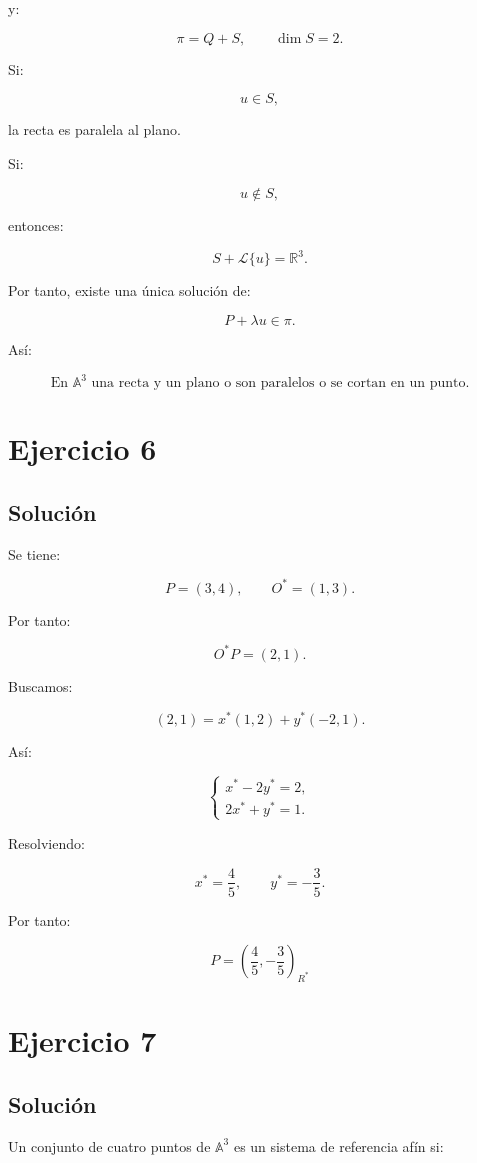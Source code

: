 \documentclass[11pt,a4paper]{article}
\newcommand{\R}{\mathbb{R}}
\begin{document}
y:

\[
\pi=Q+S,
\qquad
\dim S=2.
\]

Si:

\[
u\in S,
\]

la recta es paralela al plano.

Si:

\[
u\notin S,
\]

entonces:

\[
S+\mathcal L\{u\}=\R^3.
\]

Por tanto, existe una única solución de:

\[
P+\lambda u\in\pi.
\]

Así:

\[
\boxed{
\text{En }\mathbb A^3\text{ una recta y un plano o son paralelos o se cortan en un punto.}
}
\]

\section{Ejercicio 6}
\subsection{Solución}

Se tiene:

\[
P=(3,4),
\qquad
O^*=(1,3).
\]

Por tanto:

\[
O^*P=(2,1).
\]

Buscamos:

\[
(2,1)
=
x^*(1,2)
+
y^*(-2,1).
\]

Así:

\[
\begin{cases}
x^*-2y^*=2,\\
2x^*+y^*=1.
\end{cases}
\]

Resolviendo:

\[
x^*=\frac45,
\qquad
y^*=-\frac35.
\]

Por tanto:

\[
\boxed{
P=
\left(
\frac45,-\frac35
\right)_{R^*}
}
\]

\section{Ejercicio 7}
\subsection{Solución}

Un conjunto de cuatro puntos de \(\mathbb A^3\) es un sistema de referencia afín si:
\end{document}
